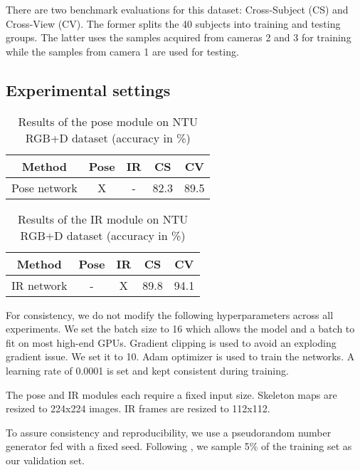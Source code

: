 \documentclass[letterpaper, 10 pt, conference]{ieeeconf}
\begin{document}
There are two benchmark evaluations for this dataset: Cross-Subject (CS) and Cross-View (CV). The former splits the 40 subjects into training and testing groups. The latter uses the samples acquired from cameras 2 and 3 for training while the samples from camera 1 are used for testing. 

\subsection{Experimental settings}

\begin{table}[t]
\caption{Results of the pose module on NTU RGB+D dataset (accuracy in \%)}
\label{skeleton_block_results}
\begin{center}
\begin{tabular}{ccccc}
Method & Pose & IR & CS & CV \\
\hline \hline
Pose network & X & - & 82.3 & 89.5 \\ 
\end{tabular} 
\end{center}
\end{table}

\begin{table}[t]
\caption{Results of the IR module on NTU RGB+D dataset  (accuracy in \%)}
\label{ir_block_results}
\begin{center}
\begin{tabular}{ccccc}
Method & Pose & IR & CS & CV \\
\hline \hline
IR network & - & X & 89.8 & 94.1 \\ 
\end{tabular} 
\end{center}
\end{table}

For consistency, we do not modify the following hyperparameters across all experiments. We set the batch size to 16 which allows the model and a batch to fit on most high-end GPUs. Gradient clipping is used to avoid an exploding gradient issue. We set it to 10. Adam optimizer \cite{kingma2014adam} is used to train the networks. A learning rate of 0.0001 is set and kept consistent during training. 

The pose and IR modules each require a fixed input size. Skeleton maps are resized to 224x224 images. IR frames are resized to 112x112. 

To assure consistency and reproducibility, we use a pseudorandom number generator fed with a fixed seed. Following \cite{shahroudy2016ntu}, we sample 5\% of the training set as our validation set.  
\end{document}
